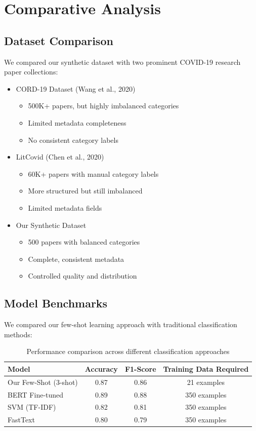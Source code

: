 \documentclass[12pt,a4paper]{article}
\begin{document}
\section{Comparative Analysis}
\subsection{Dataset Comparison}
We compared our synthetic dataset with two prominent COVID-19 research paper collections:

\begin{itemize}
    \item CORD-19 Dataset (Wang et al., 2020)
        \begin{itemize}
            \item 500K+ papers, but highly imbalanced categories
            \item Limited metadata completeness
            \item No consistent category labels
        \end{itemize}
    \item LitCovid (Chen et al., 2020)
        \begin{itemize}
            \item 60K+ papers with manual category labels
            \item More structured but still imbalanced
            \item Limited metadata fields
        \end{itemize}
    \item Our Synthetic Dataset
        \begin{itemize}
            \item 500 papers with balanced categories
            \item Complete, consistent metadata
            \item Controlled quality and distribution
        \end{itemize}
\end{itemize}

\subsection{Model Benchmarks}
We compared our few-shot learning approach with traditional classification methods:

\begin{table}[H]
\centering
\begin{tabular}{lccc}
\toprule
Model & Accuracy & F1-Score & Training Data Required \\
\midrule
Our Few-Shot (3-shot) & 0.87 & 0.86 & 21 examples \\
BERT Fine-tuned & 0.89 & 0.88 & 350 examples \\
SVM (TF-IDF) & 0.82 & 0.81 & 350 examples \\
FastText & 0.80 & 0.79 & 350 examples \\
\bottomrule
\end{tabular}
\caption{Performance comparison across different classification approaches}
\label{tab:model_comparison}
\end{table}
\end{document}

